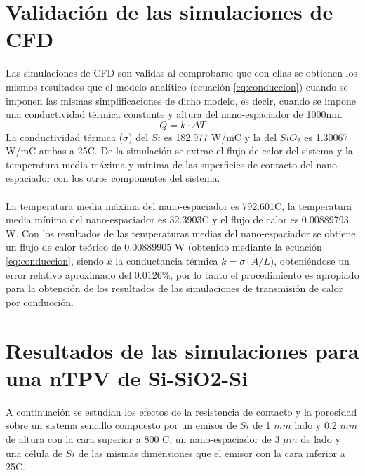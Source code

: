 \section{Validación de las simulaciones de CFD}
Las simulaciones de CFD son validas al comprobarse que con ellas se obtienen los mismos resultados que el modelo analítico (ecuación \eqref{eq:conduccion}) cuando se imponen las mismas simplificaciones de dicho modelo, es decir, cuando se impone una conductividad térmica constante y altura del nano-espaciador de 1000nm.
\begin{equation}
Q=k\cdot \Delta T
\label{eq:conduccion}
\end{equation}
La conductividad térmica ($\sigma$) del $Si$ es 182.977 W/m\textdegree C y la del $SiO_2$ es 1.30067 W/m\textdegree C ambas a 25\textdegree C. De la simulación se extrae el flujo de calor del sistema y la temperatura media máxima y mínima de las superficies de contacto del nano-espaciador con los otros componentes del sistema.\\\\
La temperatura media máxima del nano-espaciador es 792.601\textdegree C, la temperatura media mínima del nano-espaciador es 32.3903\textdegree C y el flujo de calor es 0.00889793 W. Con los resultados de las temperaturas medias del nano-espaciador se obtiene un flujo de calor teórico de 0.00889905 W (obtenido mediante la ecuación \eqref{eq:conduccion}, siendo $k$ la conductancia térmica $k=\sigma \cdot A/L$), obteniéndose un error relativo aproximado del 0.0126\%, por lo tanto el procedimiento es apropiado para la obtención de los resultados de las simulaciones de transmisión de calor por conducción.
\section{Resultados de las simulaciones para una nTPV de Si-SiO2-Si}
A continuación se estudian los efectos de la resistencia de contacto y la porosidad sobre un sistema sencillo compuesto por un emisor de $Si$ de 1 $mm$ lado y 0.2 $mm$ de altura con la cara superior a 800 \textdegree C, un nano-espaciador de 3 $\mu m$ de lado y una célula de $Si$ de las mismas dimensiones que el emisor con la cara inferior a 25\textdegree C.

